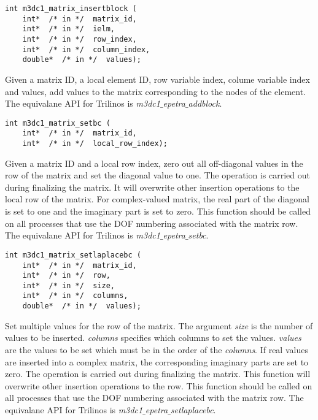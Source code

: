 \begin{verbatim}
int m3dc1_matrix_insertblock (
    int*  /* in */  matrix_id, 
    int*  /* in */  ielm, 
    int*  /* in */  row_index, 
    int*  /* in */  column_index, 
    double*  /* in */  values);
\end{verbatim}\vspace{-.5cm}\hspace{1cm}
Given a matrix ID, a local element ID, row variable index, colume variable index and values, add values to the matrix corresponding to the nodes of the element. The equivalane API for Trilinos is \textit{m3dc1$\_$epetra$\_$addblock}.
 
\begin{verbatim}
int m3dc1_matrix_setbc (
    int*  /* in */  matrix_id, 
    int*  /* in */  local_row_index);
\end{verbatim}\vspace{-.5cm}\hspace{1cm}
Given a matrix ID and a local row index, zero out all off-diagonal values in the row of the matrix and set the diagonal value to one. The operation is carried out during finalizing the matrix. It will overwrite other insertion operations to the local row of the matrix. For complex-valued matrix, the real part of the diagonal is set to one and the imaginary part is set to zero.
This function should be called on all processes that use the DOF numbering associated with the matrix row. The equivalane API for Trilinos is \textit{m3dc1$\_$epetra$\_$setbc}.

\begin{verbatim}
int m3dc1_matrix_setlaplacebc (
    int*  /* in */  matrix_id, 
    int*  /* in */  row, 
    int*  /* in */  size, 
    int*  /* in */  columns, 
    double*  /* in */  values);
\end{verbatim}\vspace{-.5cm}\hspace{1cm}
Set multiple values for the row of the matrix.
The argument \textit{size} is the  number of values to be inserted.
\textit{columns} specifies which columns to set the values. \textit{values} are the values to be set which must be in the order of the \textit{columns}.
If real values are inserted into a complex matrix, the corresponding imaginary parts are set to zero. The operation is carried out during finalizing the matrix. 
This function will overwrite other insertion operations to the row. This function should be called on all processes that use the DOF numbering associated with the matrix row. The equivalane API for Trilinos is \textit{m3dc1$\_$epetra$\_$setlaplacebc}.

